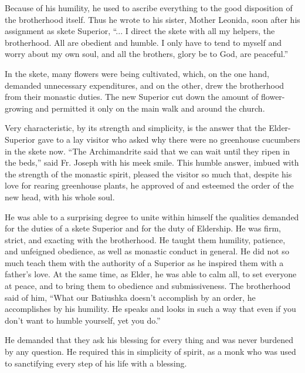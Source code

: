 Because of his humility, he used to ascribe everything to the good disposition of the brotherhood itself. Thus he wrote to his sister, Mother Leonida, soon after his assignment as skete Superior, ``... I direct the skete with all my helpers, the brotherhood. All are obedient and humble. I only have to tend to myself and worry about my own soul, and all the brothers, glory be to God, are peaceful.''

In the skete, many flowers were being cultivated, which, on the one hand, demanded unnecessary expenditures, and on the other, drew the brotherhood from their monastic duties. The new Superior cut down the amount of flower-growing and permitted it only on the main walk and around the church.

Very characteristic, by its strength and simplicity, is the answer that the Elder-Superior gave to a lay visitor who asked why there were no greenhouse cucumbers in the skete now. ``The Archimandrite said that we can wait until they ripen in the beds,'' said Fr. Joseph with his meek smile. This humble answer, imbued with the strength of the monastic spirit, pleased the visitor so much that, despite his love for rearing greenhouse plants, he approved of and esteemed the order of the new head, with his whole soul.

He was able to a surprising degree to unite within himself the qualities demanded for the duties of a skete Superior and for the duty of Eldership. He was firm, strict, and exacting with the brotherhood. He taught them humility, patience, and unfeigned obedience, as well as monastic conduct in general. He did not so much teach them with the authority of a Superior as he inspired them with a father's love. At the same time, as Elder, he was able to calm all, to set everyone at peace, and to bring them to obedience and submissiveness. The brotherhood said of him, ``What our Batiushka doesn't accomplish by an order, he accomplishes by his humility. He speaks and looks in such a way that even if you don't want to humble yourself, yet you do.''

He demanded that they ask his blessing for every thing and was never burdened by any question. He required this in simplicity of spirit, as a monk who was used to sanctifying every step of his life with a blessing.

